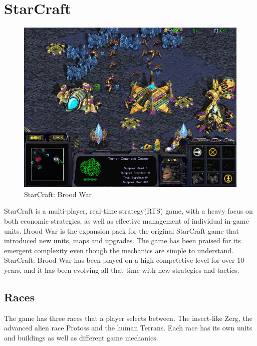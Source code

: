 
\section{StarCraft}
\label{sec:starcrafttheory}


\begin{figure}[h!tb]
\centering
\includegraphics[scale=0.5]{graphics/scbw.jpg}
\caption{StarCraft: Brood War}
\label{fig:scbwIntro}
\end{figure}

StarCraft is a multi-player, real-time strategy(RTS) game, with a heavy focus on both economic strategies, as well as effective management of individual in-game units. Brood War is the expansion pack for the original StarCraft game that introduced new units, maps and upgrades. The game has been praised for its emergent complexity even though the mechanics are simple to understand. StarCraft: Brood War has been played on a high competetive level for over 10 years, and it has been evolving all that time with new strategies and tactics.

\subsection{Races}
The game has three races that a player selects between. The insect-like Zerg, the advanced alien race Protoss and the human
Terrans. Each race has its own units and buildings as well as different game mechanics.

